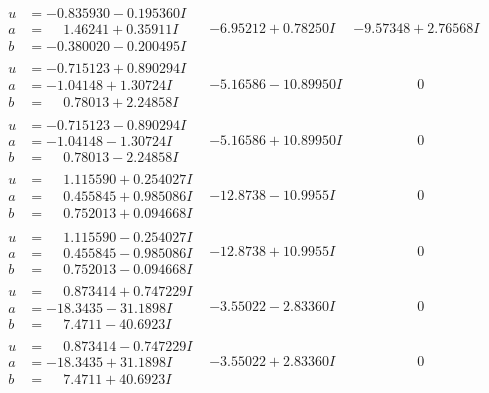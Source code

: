 \documentclass[1p]{elsarticle_modified}
\theoremstyle{definition}
\begin{document}
$$\begin{array}{c|c|c}
\begin{aligned}
u &= -0.835930 - 0.195360 I \\
a &= \phantom{-}1.46241 + 0.35911 I \\
b &= -0.380020 - 0.200495 I\end{aligned}
 & -6.95212 + 0.78250 I & -9.57348 + 2.76568 I \\ \hline\begin{aligned}
u &= -0.715123 + 0.890294 I \\
a &= -1.04148 + 1.30724 I \\
b &= \phantom{-}0.78013 + 2.24858 I\end{aligned}
 & -5.16586 - 10.89950 I & \phantom{-0.000000 } 0 \\ \hline\begin{aligned}
u &= -0.715123 - 0.890294 I \\
a &= -1.04148 - 1.30724 I \\
b &= \phantom{-}0.78013 - 2.24858 I\end{aligned}
 & -5.16586 + 10.89950 I & \phantom{-0.000000 } 0 \\ \hline\begin{aligned}
u &= \phantom{-}1.115590 + 0.254027 I \\
a &= \phantom{-}0.455845 + 0.985086 I \\
b &= \phantom{-}0.752013 + 0.094668 I\end{aligned}
 & -12.8738 - 10.9955 I & \phantom{-0.000000 } 0 \\ \hline\begin{aligned}
u &= \phantom{-}1.115590 - 0.254027 I \\
a &= \phantom{-}0.455845 - 0.985086 I \\
b &= \phantom{-}0.752013 - 0.094668 I\end{aligned}
 & -12.8738 + 10.9955 I & \phantom{-0.000000 } 0 \\ \hline\begin{aligned}
u &= \phantom{-}0.873414 + 0.747229 I \\
a &= -18.3435 - 31.1898 I \\
b &= \phantom{-}7.4711 - 40.6923 I\end{aligned}
 & -3.55022 - 2.83360 I & \phantom{-0.000000 } 0 \\ \hline\begin{aligned}
u &= \phantom{-}0.873414 - 0.747229 I \\
a &= -18.3435 + 31.1898 I \\
b &= \phantom{-}7.4711 + 40.6923 I\end{aligned}
 & -3.55022 + 2.83360 I & \phantom{-0.000000 } 0 \\ \hline\begin{aligned}

\end{aligned}
\end{array}$$
\end{document}
